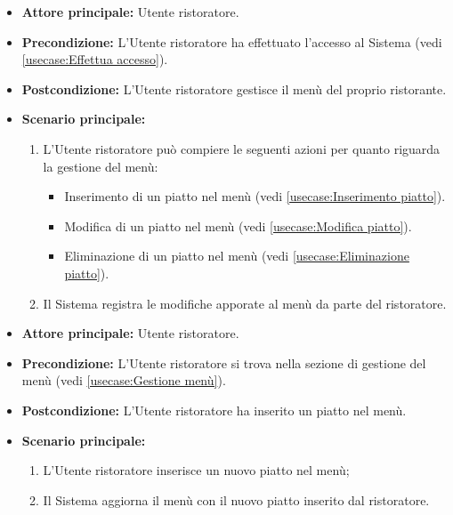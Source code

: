 \label{usecase:Gestione menù}
\begin{itemize}
	\item \textbf{Attore principale:} Utente ristoratore.

	\item \textbf{Precondizione:} L'Utente ristoratore ha effettuato l'accesso al Sistema (vedi \autoref{usecase:Effettua accesso}).

	\item \textbf{Postcondizione:} L'Utente ristoratore gestisce il menù del proprio ristorante.


	\item \textbf{Scenario principale:}
	      \begin{enumerate}

		      \item L'Utente ristoratore può compiere le seguenti azioni per quanto riguarda la gestione del menù:
		      \begin{itemize}
                \item Inserimento di un piatto nel menù (vedi \autoref{usecase:Inserimento piatto}).
                \item Modifica di un piatto nel menù (vedi \autoref{usecase:Modifica piatto}).
                \item Eliminazione di un piatto nel menù (vedi \autoref{usecase:Eliminazione piatto}).
              \end{itemize}
		      \item Il Sistema registra le modifiche apporate al menù da parte del ristoratore.

	      \end{enumerate}
\end{itemize}

\label{usecase:Inserimento piatto}
\begin{itemize}

	\item \textbf{Attore principale:} Utente ristoratore.

	\item \textbf{Precondizione:} L'Utente ristoratore si trova nella sezione di gestione del menù (vedi \autoref{usecase:Gestione menù}).

	\item \textbf{Postcondizione:} L'Utente ristoratore ha inserito un piatto nel menù.

	\item \textbf{Scenario principale:}
	\begin{enumerate}
		\item L'Utente ristoratore inserisce un nuovo piatto nel menù;
		\item Il Sistema aggiorna il menù con il nuovo piatto inserito dal ristoratore.
	\end{enumerate}

\end{itemize}


